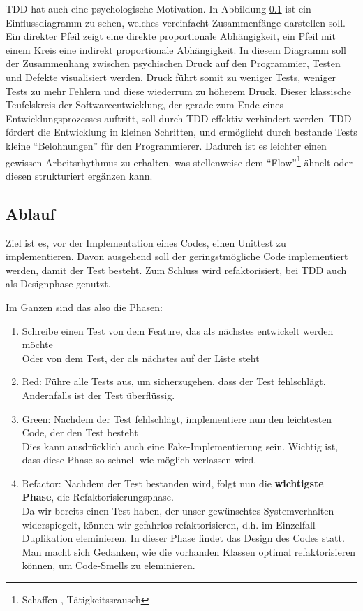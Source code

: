   
  TDD hat auch eine psychologische Motivation.
  In Abbildung \ref{} ist ein Einflussdiagramm zu sehen, welches vereinfacht Zusammenfänge darstellen soll. Ein direkter Pfeil zeigt eine direkte proportionale Abhängigkeit, ein Pfeil mit einem Kreis eine indirekt proportionale Abhängigkeit. In diesem Diagramm soll der Zusammenhang zwischen psychischen Druck auf den Programmier, Testen und Defekte visualisiert werden. Druck führt somit zu weniger Tests, weniger Tests zu mehr Fehlern und diese wiederrum zu höherem Druck. Dieser klassische Teufelskreis der Softwareentwicklung, der gerade zum Ende eines Entwicklungsprozesses auftritt, soll durch TDD effektiv verhindert werden. 
  TDD fördert die Entwicklung in kleinen Schritten, und ermöglicht durch bestande Tests kleine "`Belohnungen"' für den Programmierer. Dadurch ist es leichter einen gewissen Arbeitsrhythmus zu erhalten, was stellenweise dem "`Flow"'\footnote{Schaffen-, Tätigkeitssrausch}  ähnelt oder diesen strukturiert ergänzen kann.
  
\subsection{Ablauf}
  Ziel ist es, vor der Implementation eines Codes, einen Unittest zu implementieren. Davon ausgehend soll der geringstmögliche Code implementiert werden, damit der Test besteht. Zum Schluss wird refaktorisiert, bei TDD auch als Designphase genutzt.
  
  Im Ganzen sind das also die Phasen:
  \begin{enumerate}
   \item Schreibe einen Test von dem Feature, das als nächstes entwickelt werden möchte\\Oder von dem Test, der als nächstes auf der Liste steht
   \item Red: Führe alle Tests aus, um sicherzugehen, dass der Test fehlschlägt. Andernfalls ist der Test überflüssig.
   \item Green: Nachdem der Test fehlschlägt, implementiere nun den leichtesten Code, der den Test besteht\\
   Dies kann ausdrücklich auch eine Fake-Implementierung sein. Wichtig ist, dass diese Phase so schnell wie möglich verlassen wird.
   \item Refactor: Nachdem der Test bestanden wird, folgt nun die \textbf{wichtigste Phase}, die Refaktorisierungsphase.\\
   Da wir bereits einen Test haben, der unser gewünschtes Systemverhalten widerspiegelt, können wir gefahrlos refaktorisieren, d.h. im Einzelfall Duplikation eleminieren. In dieser Phase findet das Design des Codes statt. Man macht sich Gedanken, wie die vorhanden Klassen optimal refaktorisieren können, um Code-Smells zu eleminieren.
  \end{enumerate}
  
